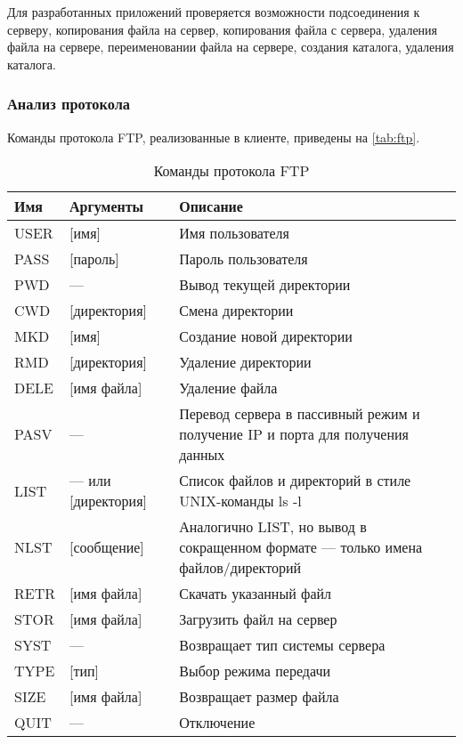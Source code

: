 Для разработанных приложений проверяется возможности подсоединения к серверу, копирования файла на сервер, копирования файла с сервера, удаления файла на сервере, переименовании файла на сервере, создания каталога, удаления каталога.

\subsubsection{Анализ протокола}

Команды протокола FTP, реализованные в клиенте, приведены на \vref{tab:ftp}.

\begin{table}[H]
	\centering
	\begin{tabular}{|M{1.5cm}|M{5cm}|M{10cm}|}
		\hline Имя & Аргументы & Описание \\
		\hline USER & [имя] & Имя пользователя \\
		\hline PASS & [пароль] & Пароль пользователя  \\
		\hline PWD & --- & Вывод текущей директории \\
		\hline CWD & [директория] & Смена директории \\
		\hline MKD & [имя] & Создание новой директории  \\
		\hline RMD & [директория] & Удаление директории  \\
		\hline DELE & [имя файла] & Удаление файла \\
		\hline PASV & --- & Перевод сервера в пассивный режим и получение IP и порта для получения данных \\
		\hline LIST & --- или [директория] & Список файлов и директорий в стиле UNIX-команды ls -l \\
		\hline NLST & [сообщение] & Аналогично LIST, но вывод в сокращенном формате --- только имена файлов/директорий  \\
		\hline RETR & [имя файла] & Скачать указанный файл  \\
		\hline STOR & [имя файла] & Загрузить файл на сервер  \\
		\hline SYST & --- & Возвращает тип системы сервера  \\
		\hline TYPE & [тип] & Выбор режима передачи  \\
		\hline SIZE & [имя файла] & Возвращает размер файла \\
		\hline QUIT & --- & Отключение  \\ \hline
	\end{tabular}
	\caption{Команды протокола FTP}
	\label{tab:ftp}
\end{table}

